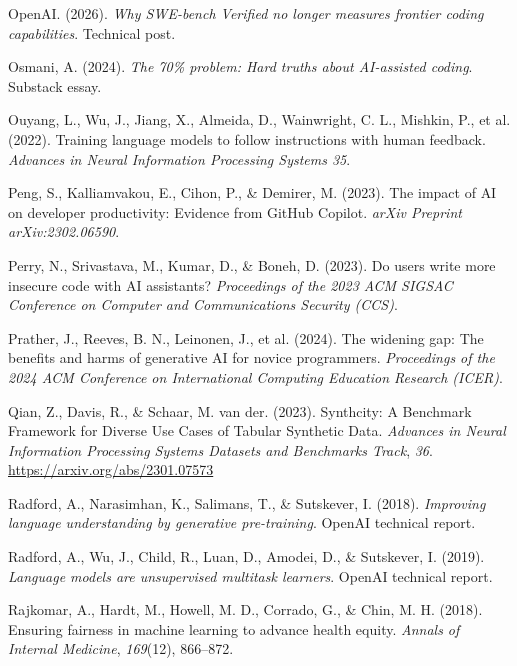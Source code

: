 \documentclass[
  letterpaper,
  11pt]{scrbook}
\newcounter{none} %
\newlength{\cslhangindent}
\newenvironment{CSLReferences}[2] %
 {\begin{list}{}{%
  \setlength{\itemindent}{0pt}
  \setlength{\leftmargin}{0pt}
  \setlength{\parsep}{0pt}
  \ifodd #1
   \setlength{\leftmargin}{\cslhangindent}
   \setlength{\itemindent}{-1\cslhangindent}
  \fi
  \setlength{\itemsep}{#2\baselineskip}}}
 {\end{list}}
\begin{document}
\begin{CSLReferences}{1}{0}
OpenAI. (2026). \emph{Why {SWE-bench Verified} no longer measures
frontier coding capabilities}. Technical post.

Osmani, A. (2024). \emph{The 70\% problem: Hard truths about
{AI}-assisted coding}. Substack essay.

{Ouyang, L., Wu, J., Jiang, X., Almeida, D., Wainwright, C. L., Mishkin,
P., et al.} (2022). Training language models to follow instructions with
human feedback. \emph{Advances in Neural Information Processing Systems
35}.

Peng, S., Kalliamvakou, E., Cihon, P., \& Demirer, M. (2023). The impact
of {AI} on developer productivity: Evidence from {GitHub Copilot}.
\emph{arXiv Preprint arXiv:2302.06590}.

Perry, N., Srivastava, M., Kumar, D., \& Boneh, D. (2023). Do users
write more insecure code with {AI} assistants? \emph{Proceedings of the
2023 ACM SIGSAC Conference on Computer and Communications Security
(CCS)}.

{Prather, J., Reeves, B. N., Leinonen, J., et al.} (2024). The widening
gap: The benefits and harms of generative {AI} for novice programmers.
\emph{Proceedings of the 2024 ACM Conference on International Computing
Education Research (ICER)}.

Qian, Z., Davis, R., \& Schaar, M. van der. (2023). {Synthcity}: {A
Benchmark Framework for Diverse Use Cases of Tabular Synthetic Data}.
\emph{Advances in Neural Information Processing Systems Datasets and
Benchmarks Track}, \emph{36}. \url{https://arxiv.org/abs/2301.07573}

Radford, A., Narasimhan, K., Salimans, T., \& Sutskever, I. (2018).
\emph{Improving language understanding by generative pre-training}.
OpenAI technical report.

Radford, A., Wu, J., Child, R., Luan, D., Amodei, D., \& Sutskever, I.
(2019). \emph{Language models are unsupervised multitask learners}.
OpenAI technical report.

Rajkomar, A., Hardt, M., Howell, M. D., Corrado, G., \& Chin, M. H.
(2018). Ensuring fairness in machine learning to advance health equity.
\emph{Annals of Internal Medicine}, \emph{169}(12), 866--872.


\end{CSLReferences}
\end{document}
